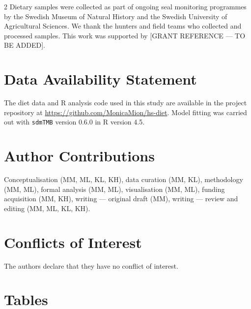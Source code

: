 \begin{spacing}{2}
Dietary samples were collected as part of ongoing seal monitoring programmes
by the Swedish Museum of Natural History and the Swedish University of
Agricultural Sciences. We thank the hunters and field teams who collected
and processed samples. This work was supported by [GRANT REFERENCE --- TO BE
ADDED].

\section{Data Availability Statement}

The diet data and R analysis code used in this study are available in the
project repository at \url{https://github.com/MonicaMion/hs-diet}. Model
fitting was carried out with \texttt{sdmTMB} version 0.6.0
\citep{Anderson2024} in R version 4.5.

\section{Author Contributions}

Conceptualisation (MM, ML, KL, KH), data curation (MM, KL), methodology
(MM, ML), formal analysis (MM, ML), visualisation (MM, ML), funding
acquisition (MM, KH), writing --- original draft (MM), writing --- review
and editing (MM, ML, KL, KH).

\section{Conflicts of Interest}

The authors declare that they have no conflict of interest.



\end{spacing}

\clearpage

\section{Tables}

